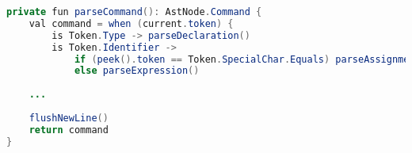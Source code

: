 \begin{lstlisting}[language=java,label=lis:parseCommand,caption=A simplified version of the parse declaration method from the parser.]
private fun parseCommand(): AstNode.Command {
    val command = when (current.token) {
	    is Token.Type -> parseDeclaration()
	    is Token.Identifier ->
		    if (peek().token == Token.SpecialChar.Equals) parseAssignment() 
		    else parseExpression()
    
    ...
    
    flushNewLine()
    return command
}
\end{lstlisting}



